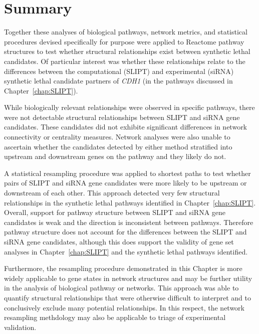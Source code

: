 \section{Summary}

Together these analyses of biological pathways, network metrics, and statistical procedures devised specifically for purpose were applied to Reactome pathway structures to test whether structural relationships exist between synthetic lethal candidates. Of particular interest was whether these relationships relate to the differences between the computational (\gls{SLIPT}) and experimental (\gls{siRNA}) synthetic lethal candidate partners of \textit{CDH1} (in the pathways discussed in Chapter~\ref{chap:SLIPT}).

While biologically relevant relationships were observed in specific pathways, there were not detectable structural relationships between \gls{SLIPT} and \gls{siRNA} gene candidates. These candidates did not exhibite significant differences in network connectivity or centrality measures. Network analyses were also unable to ascertain whether the candidates detected by either method stratified into upstream and downstream genes on the pathway and they likely do not.

A statistical resampling procedure was applied to shortest paths to test whether pairs of \gls{SLIPT} and \gls{siRNA} gene candidates were more likely to be upstream or downstream of each other. This approach detected very few structural relationships in the synthetic lethal pathways identified in Chapter~\ref{chap:SLIPT}. Overall, support for pathway structure between \gls{SLIPT} and \gls{siRNA} gene candidates is weak and the direction is inconsistent between pathways. Therefore pathway structure does not account for the differences between the \gls{SLIPT} and \gls{siRNA} gene candidates, although this does support the validity of gene set analyses in Chapter~\ref{chap:SLIPT} and the synthetic lethal pathways identified.

Furthermore, the resampling procedure demonstrated in this Chapter is more widely applicable to gene states in network structures and may be further utility in the analysis of biological pathway or networks. This approach was able to quantify structural relationships that were otherwise difficult to interpret and to conclusively exclude many potential relationships. In this respect, the network resampling methdology may also be applicable to triage of experimental validation.

\clearpage

